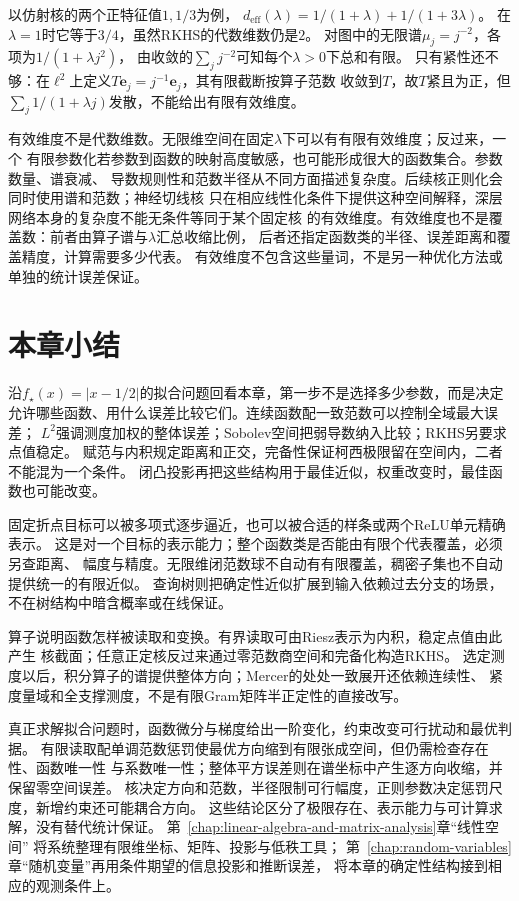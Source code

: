 以仿射核的两个正特征值$1,1/3$为例，
$d_{\mathrm{eff}}(\lambda)=1/(1+\lambda)+1/(1+3\lambda)$。
在$\lambda=1$时它等于$3/4$，虽然RKHS的代数维数仍是$2$。
对图中的无限谱$\mu_j=j^{-2}$，各项为$1/(1+\lambda j^2)$，
由收敛的$\sum_j j^{-2}$可知每个$\lambda>0$下总和有限。
只有紧性还不够：在$\ell^2$上定义$T\bm e_j=j^{-1}\bm e_j$，其有限截断按算子范数
收敛到$T$，故$T$紧且为正，但$\sum_j1/(1+\lambda j)$发散，不能给出有限有效维度。

有效维度不是代数维数。无限维空间在固定$\lambda$下可以有有限有效维度；反过来，一个
有限参数化若参数到函数的映射高度敏感，也可能形成很大的函数集合。参数数量、谱衰减、
导数规则性和范数半径从不同方面描述复杂度。后续核正则化会同时使用谱和范数；神经切线核
只在相应线性化条件下提供这种空间解释，深层网络本身的复杂度不能无条件等同于某个固定核
的有效维度。有效维度也不是覆盖数：前者由算子谱与$\lambda$汇总收缩比例，
后者还指定函数类的半径、误差距离和覆盖精度，计算需要多少代表。
有效维度不包含这些量词，不是另一种优化方法或单独的统计误差保证。

\section{本章小结}
\label{sec:functional-analysis-approximation-summary}

沿$f_\star(x)=|x-1/2|$的拟合问题回看本章，第一步不是选择多少参数，而是决定
允许哪些函数、用什么误差比较它们。连续函数配一致范数可以控制全域最大误差；
$L^2$强调测度加权的整体误差；Sobolev空间把弱导数纳入比较；RKHS另要求点值稳定。
赋范与内积规定距离和正交，完备性保证柯西极限留在空间内，二者不能混为一个条件。
闭凸投影再把这些结构用于最佳近似，权重改变时，最佳函数也可能改变。

固定折点目标可以被多项式逐步逼近，也可以被合适的样条或两个ReLU单元精确表示。
这是对一个目标的表示能力；整个函数类是否能由有限个代表覆盖，必须另查距离、
幅度与精度。无限维闭范数球不自动有有限覆盖，稠密子集也不自动提供统一的有限近似。
查询树则把确定性近似扩展到输入依赖过去分支的场景，不在树结构中暗含概率或在线保证。

算子说明函数怎样被读取和变换。有界读取可由Riesz表示为内积，稳定点值由此产生
核截面；任意正定核反过来通过零范数商空间和完备化构造RKHS。
选定测度以后，积分算子的谱提供整体方向；Mercer的处处一致展开还依赖连续性、
紧度量域和全支撑测度，不是有限Gram矩阵半正定性的直接改写。

真正求解拟合问题时，函数微分与梯度给出一阶变化，约束改变可行扰动和最优判据。
有限读取配单调范数惩罚使最优方向缩到有限张成空间，但仍需检查存在性、函数唯一性
与系数唯一性；整体平方误差则在谱坐标中产生逐方向收缩，并保留零空间误差。
核决定方向和范数，半径限制可行幅度，正则参数决定惩罚尺度，新增约束还可能耦合方向。
这些结论区分了极限存在、表示能力与可计算求解，没有替代统计保证。
第~\ref{chap:linear-algebra-and-matrix-analysis}章“线性空间”
将系统整理有限维坐标、矩阵、投影与低秩工具；
第~\ref{chap:random-variables}章“随机变量”再用条件期望的信息投影和推断误差，
将本章的确定性结构接到相应的观测条件上。
